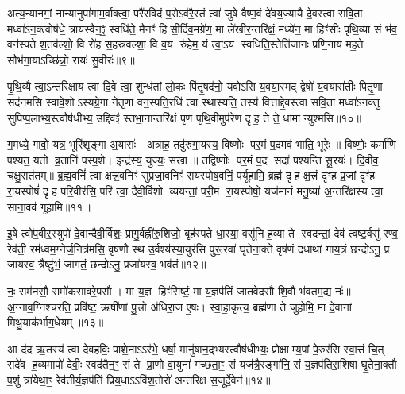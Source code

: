 अत्य॒न्यानगां॒ नान्यानुपा॑गाम॒र्वाक्त्वा॒ परै॑रविदं प॒रोऽव॑रै॒स्तं त्वा॑ जुषे वैष्ण॒वं दे॑वय॒ज्यायै॑ दे॒वस्त्वा॑ सवि॒ता मध्वा॑ऽन॒क्त्वोष॑धे॒ त्राय॑स्वैन॒ꣵ॒ स्वधि॑ते॒ मैनꣳ॑ हिसी॒र्दिव॒मग्रे॑ण॒ मा ले॑खीर॒न्तरि॑क्षं॒ मध्ये॑न॒ मा हिꣳ॑सीः पृथि॒व्या सं भ॑व॒ वन॑स्पते श॒तव॑ल्\mbox{}शो॒ वि रो॑ह स॒हस्र॑वल्\mbox{}शा॒ वि व॒य रु॑हेम॒ यं त्वा॒ऽय स्वधि॑ति॒स्तेति॑जानः प्रणि॒नाय॑ मह॒ते सौभ॑गा॒याऽच्छि॑न्नो॒ रायः॑ सु॒वीरः॑॥९॥

{\anuvakamend[{यं दश॑ च॥५॥}]}

पृ॒थि॒व्यै त्वा॒ऽन्तरि॑क्षाय त्वा दि॒वे त्वा॒ शुन्ध॑तां लो॒कः पि॑तृ॒षद॑नो॒ यवो॑ऽसि य॒वया॒स्मद् द्वेषो॑ य॒वयारा॑तीः पितृ॒णा सद॑नमसि स्वावे॒शोऽस्यग्रे॒गा ने॑तृ॒णां वन॒स्पति॒रधि॑ त्वा स्थास्यति॒ तस्य॑ वित्ताद्दे॒वस्त्वा॑ सवि॒ता मध्वा॑ऽनक्तु सुपिप्प॒लाभ्य॒स्त्वौष॑धीभ्य॒ उद्दिवꣵ॑ स्तभा॒नान्तरि॑क्षं पृण पृथि॒वीमुप॑रेण दृह॒ ते ते॒ धामान्युश्मसि॥१०॥

ग॒मध्ये॒ गावो॒ यत्र॒ भूरि॑शृङ्गा अ॒यासः॑। अत्राह॒ तदु॑रुगा॒यस्य॒ विष्णोः पर॒मं प॒दमव॑ भाति॒ भूरेः॥ विष्णोः॒ कर्मा॑णि पश्यत॒ यतो व्र॒तानि॑ पस्प॒शे। इन्द्र॑स्य॒ युज्यः॒ सखा॥ तद्विष्णोः पर॒मं प॒द सदा॑ पश्यन्ति सू॒रयः॑। दि॒वीव॒ चक्षु॒रात॑तम्॥ ब्र॒ह्म॒वनिं॑ त्वा क्षत्त्र॒वनिꣳ॑ सुप्रजा॒वनिꣳ॑ रायस्पोष॒वनिं॒ पर्यू॑हामि॒ ब्रह्म॑ दृह क्ष॒त्त्रं दृꣳ॑ह प्र॒जां दृꣳ॑ह रा॒यस्पोषं॑ दृह परि॒वीर॑सि॒ परि॑ त्वा॒ दैवी॒र्विशो व्ययन्तां॒ परी॒म रा॒यस्पोषो॒ यज॑मानं मनु॒ष्या॑ अ॒न्तरि॑क्षस्य त्वा॒ साना॒वव॑ गूहामि॥११॥

{\anuvakamend[{उ॒श्म॒सी॒ पोष॒मेका॒न्नविꣳ॑श॒तिश्च॑॥६॥}]}

इ॒षे त्वो॑प॒वीर॒स्युपो॑ दे॒वान्दैवी॒र्विशः॒ प्रागु॒र्वह्नी॑रु॒शिजो॒ बृह॑स्पते धा॒रया॒ वसू॑नि ह॒व्या ते स्वदन्तां॒ देव॑ त्वष्ट॒र्वसु॑ रण्व॒ रेव॑ती॒ रम॑ध्वम॒ग्नेर्ज॒नित्र॑मसि॒ वृष॑णौ स्थ उ॒र्वश्य॑स्या॒युर॑सि पुरू॒रवा॑ घृ॒तेना॒क्ते वृष॑णं दधाथां गाय॒त्रं छन्दोऽनु॒ प्र जा॑यस्व॒ त्रैष्टु॑भं॒ जाग॑तं॒ छन्दोऽनु॒ प्रजा॑यस्व॒ भव॑तं॥१२॥

नः॒ सम॑नसौ॒ समो॑कसावरे॒पसौ। मा य॒ज्ञ हिꣳ॑सिष्टं॒ मा य॒ज्ञप॑तिं जातवेदसौ शि॒वौ भ॑वतम॒द्य नः॑॥ अ॒ग्नाव॒ग्निश्च॑रति॒ प्रवि॑ष्ट॒ ऋषी॑णां पु॒त्त्रो अ॑धिरा॒ज ए॒षः। स्वा॒हा॒कृत्य॒ ब्रह्म॑णा ते जुहोमि॒ मा दे॒वानां मिथु॒याक॑र्भाग॒धेयम्॥१३॥

{\anuvakamend[{भव॑त॒मेक॑त्रिशच्च॥७॥}]}

आ द॑द ऋ॒तस्य॑ त्वा देवहविः॒ पाशे॒नाऽऽर॑भे॒ धर्\mbox{}षा॒ मानु॑षान॒द्भ्यस्त्वौष॑धीभ्यः॒ प्रोक्षाम्य॒पां पे॒रुर॑सि स्वा॒त्तं चि॒त् सदे॑व ह॒व्यमापो॑ देवीः॒ स्वद॑तैन॒ꣳ॒ सं ते प्रा॒णो वा॒युना॑ गच्छता॒ꣳ॒ सं यज॑त्रै॒रङ्गा॑नि॒ सं य॒ज्ञप॑तिरा॒शिषा॑ घृ॒तेना॒क्तौ प॒शुं त्रा॑येथा॒ꣳ॒ रेव॑तीर्य॒ज्ञप॑तिं प्रिय॒धाऽऽवि॑श॒तोरो॑ अन्तरिक्ष स॒जूर्दे॒वेन॑॥१४॥

